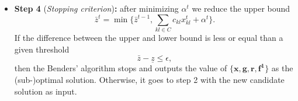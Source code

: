 \begin{itemize}
\begin{mini!}[2]
    \end{mini!}
    \item \textbf{Step 4} (\textit{Stopping criterion})\textbf{:} after minimizing $\alpha^{t}$ we reduce the upper bound
    \begin{equation}
        \bar{z}^{t} = \min \{\bar{z}^{t-1}, \sum_{kl \in C}c_{kl}x_{kl}^{t} + \alpha^{t}\}.
    \end{equation}
    If the difference between the upper and lower bound is less or equal than a given threshold
    \begin{equation}
        \bar{z} - \underline{z} \leq \epsilon,
    \end{equation}
    then the Benders' algorithm stops and outputs the value of $\{\mathbf{x},\mathbf{g},\mathbf{r},\mathbf{f^{1}}\}$ as the (sub-)optimal solution. Otherwise, it goes to step 2 with the new candidate solution as input.
\end{itemize}
